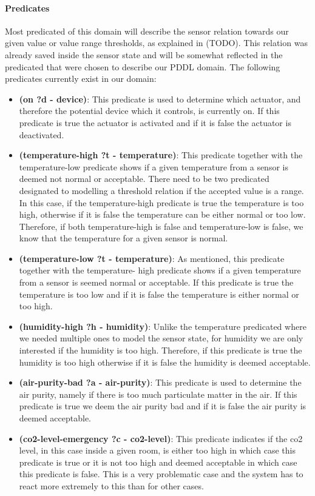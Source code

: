 \paragraph{Predicates}
Most predicated of this domain will describe the sensor relation towards our given value or value range thresholds, as explained in (TODO). This relation was already saved inside the sensor state and will be somewhat reflected in the predicated that were chosen to describe our PDDL domain. The following predicates currently exist in our domain:
\begin{itemize}
    \item \textbf{(on ?d - device)}: This predicate is used to determine which actuator, and therefore the potential device which it controls, is currently on. If this predicate is true the actuator is activated and if it is false the actuator is deactivated.
    \item \textbf{(temperature-high ?t - temperature)}: This predicate together with the temperature-low predicate shows if a given temperature from a sensor is deemed not normal or acceptable. There need to be two predicated designated to modelling a threshold relation if the accepted value is a range. In this case, if the temperature-high predicate is true the temperature is too high, otherwise if it is false the temperature can be either normal or too low. Therefore, if both temperature-high is false and temperature-low is false, we know that the temperature for a given sensor is normal.
    \item \textbf{(temperature-low ?t - temperature)}: As mentioned, this predicate together with the temperature- high predicate shows if a given temperature from a sensor is seemed normal or acceptable. If this predicate is true the temperature is too low and if it is false the temperature is either normal or too high.
    \item \textbf{(humidity-high ?h - humidity)}: Unlike the temperature predicated where we needed multiple ones to model the sensor state, for humidity we are only interested if the humidity is too high. Therefore, if this predicate is true the humidity is too high otherwise if it is false the humidity is deemed acceptable.
    \item \textbf{(air-purity-bad ?a - air-purity)}: This predicate is used to determine the air purity, namely if there is too much particulate matter in the air. If this predicate is true we deem the air purity bad and if it is false the air purity is deemed acceptable.
    \item \textbf{(co2-level-emergency ?c - co2-level)}: This predicate indicates if the co2 level, in this case inside a given room, is either too high in which case this predicate is true or it is not too high and deemed acceptable in which case this predicate is false. This is a very problematic case and the system has to react more extremely to this than for other cases.
\end{itemize}

